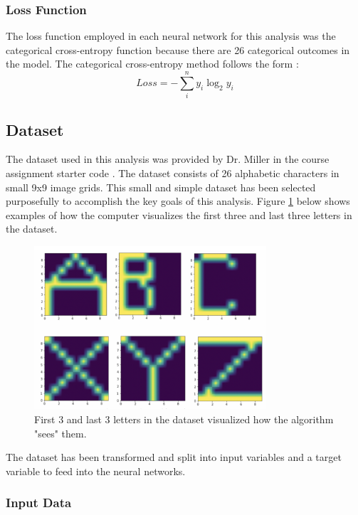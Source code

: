 \documentclass[5p,authoryear]{elsarticle}
\begin{document}
\subsubsection{Loss Function}\label{loss}

The loss function employed in each neural network for this analysis was the categorical cross-entropy function because there are 26 categorical outcomes in the model. The categorical cross-entropy method follows the form \citep{mool}:
\begin{equation}
    Loss = -\sum_i^n{y_i\log_2 y_i}
\end{equation}


\subsection{Dataset}\label{data}

The dataset used in this analysis was provided by Dr. Miller in the course assignment starter code \citep{sample-code}. 
The dataset consists of 26 alphabetic characters in small 9x9 image grids. 
This small and simple dataset has been selected purposefully to accomplish the key goals of this analysis. 
Figure \ref{abc} below shows examples of how the computer visualizes the first three and last three letters in the dataset. 

\begin{figure}[!htb] \centering
	\includegraphics[width=3.4in]{figures/abc_xyz.png}
	\caption[]{First 3 and last 3 letters in the dataset visualized how the algorithm "sees" them.} 
	\label{abc} 
\end{figure}

The dataset has been transformed and split into input variables and a target variable to feed into the neural networks. 


\subsubsection{Input Data}\label{input}
\end{document}
